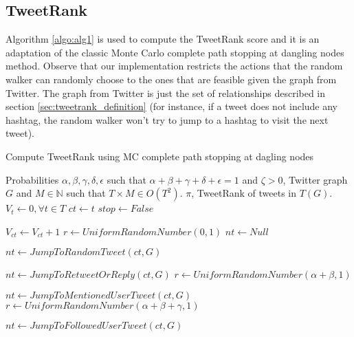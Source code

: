 \subsection{TweetRank}\label{sec:tweetrank_implementation}
Algorithm \ref{algo:alg1} is used to compute the TweetRank score and it is an adaptation of the classic Monte Carlo complete path stopping at dangling nodes method. Observe that our implementation restricts the actions that the random walker can randomly choose to the ones that are feasible given the graph from Twitter. The graph from Twitter is just the set of relationships described in section \ref{sec:tweetrank_definition} (for instance, if a tweet does not include any hashtag, the random walker won't try to jump to a hashtag to visit the next tweet).

\begin{algorithm}
\caption{Compute TweetRank using MC complete path stopping at dagling nodes}
\label{algo:alg1}
{\fontsize{8}{8}\selectfont
\begin{algorithmic}
\REQUIRE Probabilities $\alpha, \beta, \gamma, \delta, \epsilon$ such that $\alpha+\beta+\gamma+\delta+\epsilon=1$ and $\zeta > 0$, Twitter graph $G$ and $M \in \mathbb{N}$ such that $T\times M \in O(T^2)$.
\ENSURE $\pi$, TweetRank of tweets in $T(G)$.
\STATE $V_t \leftarrow 0, \forall t \in T$
\STATE $ct \leftarrow t$
\STATE $stop \leftarrow False$

\STATE $V_{ct} \leftarrow V_{ct} + 1$ 
\STATE $r \leftarrow UniformRandomNumber(0,1)$ 
\STATE $nt \leftarrow Null$ 

\STATE $nt \leftarrow JumpToRandomTweet(ct, G)$ 
\ENDIF

\STATE $nt \leftarrow JumpToRetweetOrReply(ct, G)$ 
\STATE $r \leftarrow UniformRandomNumber(\alpha + \beta,1)$ 
\ENDIF

\STATE $nt \leftarrow JumpToMentionedUserTweet(ct, G)$ 
\STATE $r \leftarrow UniformRandomNumber(\alpha + \beta + \gamma,1)$ 
\ENDIF

\STATE $nt \leftarrow JumpToFollowedUserTweet(ct, G)$ 
\ENDIF


\end{algorithmic}}
\end{algorithm}

